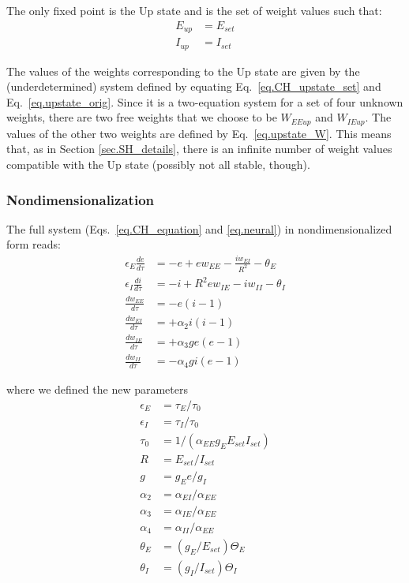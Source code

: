\documentclass[
twocolumn,
]{article}
\newcommand{\EE}{\mathit{EE}}
\newcommand{\EI}{\mathit{EI}}
\newcommand{\IE}{\mathit{IE}}
\newcommand{\II}{\mathit{II}}
\newcommand{\set}{\mathit{set}}
\newcommand{\up}{\mathit{up}}
\begin{document}
The only fixed point is the Up state and is the set of weight values such that:
\begin{equation}
\begin{aligned}
E_{\up} & = E_{\set} \\
I_{\up} & = I_{\set}
\end{aligned}
\label{eq.CH_upstate_set}
\end{equation}

\noindent The values of the weights corresponding to the Up state are given by the (underdetermined) system defined by equating Eq.\ \ref{eq.CH_upstate_set} and Eq.\ \ref{eq.upstate_orig}. Since it is a two-equation system for a set of four unknown weights, there are two free weights that we choose to be $W_{\EE\up}$ and $W_{\IE\up}$. The values of the other two weights are defined by Eq.\ \ref{eq.upstate_W}. This means that, as in Section \ref{sec.SH_details}, there is an infinite number of weight values compatible with the Up state (possibly not all stable, though).


\subsubsection{Nondimensionalization}

The full system (Eqs.\ \ref{eq.CH_equation} and \ref{eq.neural}) in nondimensionalized form reads:
\begin{equation}
\begin{aligned}
\epsilon_E \frac{de}{d\tau} & = -e + e w_{\EE} - \frac{i w_{\EI}}{R^2} - \theta_E \\
\epsilon_I \frac{di}{d\tau} & = -i + R^2 e w_{\IE} - i w_{\II} - \theta_I \\
\frac{dw_{\EE}}{d\tau} & = -e(i - 1) \\
\frac{dw_{\EI}}{d\tau} & = +\alpha_2 i(i - 1) \\
\frac{dw_{\IE}}{d\tau} & = +\alpha_3 g e (e - 1) \\
\frac{dw_{\II}}{d\tau} & = -\alpha_4 g i(e - 1)
\end{aligned}
\label{eq.CH_full_norm}
\end{equation}

\noindent where we defined the new parameters
\begin{displaymath}
\begin{aligned}
\epsilon_E & = \tau_E/\tau_0 \\
\epsilon_I & = \tau_I/\tau_0 \\
\tau_0 & = 1/(\alpha_{\EE} g_E E_{\set} I_{\set}) \\
R & = E_{\set}/I_{\set} \\
g & = g_Ee/g_I \\
\alpha_2 & = \alpha_{\EI}/\alpha_{\EE} \\
\alpha_3 & = \alpha_{\IE}/\alpha_{\EE} \\
\alpha_4 & = \alpha_{\II}/\alpha_{\EE} \\
\theta_E & = (g_E/E_{\set}) \Theta_E \\
\theta_I & = (g_I/I_{\set}) \Theta_I
\end{aligned}
\end{displaymath}
\end{document}
